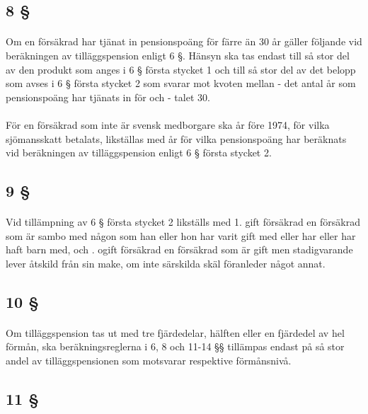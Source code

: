 \documentclass[a4paper,notitlepage,openany,10pt]{book}
\begin{document}
\subsection*{8 §}
\paragraph*{}
Om en försäkrad har tjänat in pensionspoäng för färre än 30 år gäller följande vid beräkningen av tilläggspension enligt 6 §. Hänsyn ska tas endast till så stor del av den produkt som anges i 6 § första stycket 1 och till så stor del av det belopp som avses i 6 § första stycket 2 som svarar mot kvoten mellan
\newline - det antal år som pensionspoäng har tjänats in för och
\newline - talet 30.
\paragraph*{}
För en försäkrad som inte är svensk medborgare ska år före 1974, för vilka sjömansskatt betalats, likställas med år för vilka pensionspoäng har beräknats vid beräkningen av tilläggspension enligt 6 § första stycket 2.
\subsection*{9 §}
\paragraph*{}
Vid tillämpning av 6 § första stycket 2 likställs med 1. gift försäkrad en försäkrad som är sambo med någon som han eller hon har varit gift med eller har eller har haft barn med, och
. ogift försäkrad en försäkrad som är gift men stadigvarande lever åtskild från sin make, om inte särskilda skäl föranleder något annat.
\subsection*{10 §}
\paragraph*{}
Om tilläggspension tas ut med tre fjärdedelar, hälften eller en fjärdedel av hel förmån, ska beräkningsreglerna i 6, 8 och 11-14 §§ tillämpas endast på så stor andel av tilläggspensionen som motsvarar respektive förmånsnivå.
\subsection*{11 §}
\end{document}

